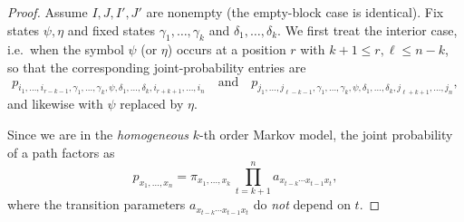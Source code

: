 \documentclass[10pt,a4paper]{amsart}
\renewcommand{\emph}[1]{\textit{#1}}
\begin{document}
\begin{proof}
Assume $I,J,I',J'$ are nonempty (the empty-block case is identical). Fix states
$\psi,\eta$ and fixed states $\gamma_1,\dots,\gamma_k$ and $\delta_1,\dots,\delta_k$.
We first treat the interior case, i.e.\ when the symbol $\psi$ (or $\eta$) occurs at a position
$r$ with $k+1\le r,\ell\le n-k$, so that the
corresponding joint-probability entries are
\[
p_{i_1,\dots,i_{r-k-1},\gamma_1,\dots,\gamma_k,\psi,\delta_1,\dots,\delta_k,i_{r+k+1},\dots,i_n}
\quad\text{and}\quad
p_{j_1,\dots,j_{\ell-k-1},\gamma_1,\dots,\gamma_k,\psi,\delta_1,\dots,\delta_k,j_{\ell+k+1},\dots,j_n},
\]
and likewise with $\psi$ replaced by $\eta$.


\medskip

Since we are in the \emph{homogeneous} $k$-th order Markov model, the joint probability of a path
factors as
\[
p_{x_1,\dots,x_n}
=\pi_{x_1,\dots,x_k}\,\prod_{t=k+1}^{n} a_{x_{t-k}\cdots x_{t-1}x_t},
\]
where the transition parameters $a_{x_{t-k}\cdots x_{t-1}x_t}$ do \emph{not} depend on $t$.


\end{proof}
\end{document}
